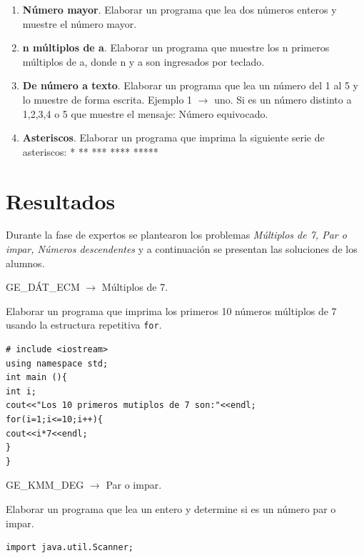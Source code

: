 \documentclass[twoside]{article}
\begin{document}
\begin{multicols}{2}
\begin{enumerate}
	\item \textbf{Número mayor}. Elaborar un programa que lea dos números enteros y muestre el número mayor.
	\item \textbf{n múltiplos de a}. Elaborar un programa que muestre los n primeros múltiplos de a, donde n y a son ingresados por teclado.
	\item \textbf{De número a texto}. Elaborar un programa que lea un número del 1 al 5 y lo muestre de forma escrita. Ejemplo 1 $\longrightarrow$ uno. Si es un número distinto a 1,2,3,4 o 5 que muestre el mensaje: Número equivocado.
	\item \textbf{Asteriscos}. Elaborar un programa que imprima la siguiente serie de asteriscos: \newline 	
	\hbox{*} \newline
	\hbox{**} \newline
	\hbox{***} \newline
	\hbox{****} \newline
	\hbox{*****} 	
\end{enumerate}
\section{Resultados}
Durante la fase de expertos se plantearon los problemas \emph{Múltiplos de 7, Par o impar, Números descendentes} y a continuación se presentan las soluciones de los alumnos.

\begin{center}
	GE\_DÁT\_ECM $\longrightarrow$ Múltiplos de 7.
\end{center}

Elaborar un programa que imprima los primeros 10 números múltiplos de 7 usando la estructura repetitiva \texttt{for}.

\lstset{language=C, breaklines=true, basicstyle=\footnotesize}
\begin{lstlisting}
# include <iostream>
using namespace std;
int main (){
int i;
cout<<"Los 10 primeros mutiplos de 7 son:"<<endl;
for(i=1;i<=10;i++){
cout<<i*7<<endl;
}
}
\end{lstlisting}
\begin{center}
	GE\_KMM\_DEG $\longrightarrow$ Par o impar.
\end{center}

Elaborar un programa que lea un entero y determine si es un número par o impar.

\lstset{language=Java, breaklines=true, basicstyle=\footnotesize}
\begin{lstlisting}
import java.util.Scanner;


\end{lstlisting}
\end{multicols}
\end{document}
